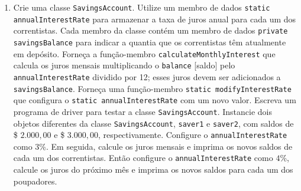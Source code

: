 \documentclass[fleqn]{article}
\begin{document}
\begin{enumerate}
{      Por fim, crie um método que permita alterar o fator de incremento da temperatura depois de um objeto já ter sido criado.
   }

   \item{
      Crie uma classe \texttt{SavingsAccount}. Utilize um membro de dados \texttt{static annualInterestRate} para armazenar a taxa de juros anual para cada um dos correntistas. Cada membro da classe contém um membro de dados \texttt{private savingsBalance} para indicar a quantia que os correntistas têm atualmente em depósito. Forneça a função-membro \texttt{calculateMonthlyInterest} que calcula os juros mensais multiplicando o \texttt{balance} [saldo] pelo \texttt{annualInterestRate} dividido por 12; esses juros devem ser adicionados a \texttt{savingsBalance}. Forneça uma função-membro \texttt{static modifyInterestRate} que configura o \texttt{static annualInterestRate} com um novo valor. Escreva um programa de driver para testar a classe \texttt{SavingsAccount}. Instancie dois objetos diferentes da classe \texttt{SavingsAccount}, \texttt{saver1} e \texttt{saver2}, com saldos de \$ $2.000,00$ e \$ $3.000,00$, respectivamente. Configure o \texttt{annualInterestRate} como $3$\%. Em seguida, calcule os juros mensais e imprima os novos saldos de cada um dos correntistas. Então configure o \texttt{annualInterestRate} como $4$\%, calcule os juros do próximo mês e imprima os novos saldos para cada um dos poupadores.
   }

\end{enumerate}

\pagebreak
{}
\end{document}
